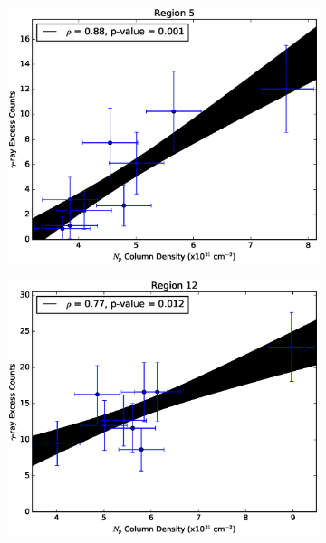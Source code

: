 \documentclass[12pt,a4paper]{article}
\begin{document}
\begin{appendices}
\begin{figure}[H]
\begin{subfigure}{0.5\textwidth}
		\centering
		\includegraphics[width=0.9\linewidth, height=0.27\textheight]{gamma_nHI_reg5}
		\label{fig:gnHIreg5}
	\end{subfigure}
	\begin{subfigure}{0.5\textwidth}
		\centering
		\includegraphics[width=0.9\linewidth, height=0.27\textheight]{gamma_nHI_reg12}
		\label{fig:gnHIreg12}
	\end{subfigure}
	\begin{subfigure}{0.5\textwidth}
		\centering

\end{subfigure}
\end{figure}
\end{appendices}
\end{document}
